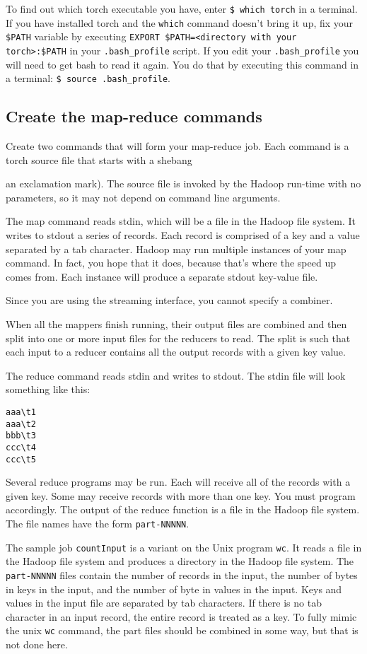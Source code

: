 \documentclass{article}
\let\code\texttt %
\begin{document}
To find out which torch executable you have, enter \code{\$ which torch} in
a terminal. If you have installed torch and the \code{which} command
doesn't bring it up, fix your \code{\$PATH} variable by executing 
\code{EXPORT \$PATH=<directory with your torch>:\$PATH} in your
\code{.bash\_profile} script. If you edit your \code{.bash\_profile} you
will need to get bash to read it again. You do that by executing this
command in a terminal: \code{\$ source .bash\_profile}.

\subsection{Create the map-reduce commands}

Create two commands that will form your map-reduce job. Each command is
a torch source file that starts with a shebang {an exclamation mark).
The source file is invoked by the Hadoop run-time with no parameters,
so it may not depend on command line arguments.

The map command reads stdin, which will be a file in the Hadoop file
system. It writes to stdout a series of records. Each record is
comprised of a key and a value separated by a tab character. Hadoop 
may run multiple instances of your map command. In fact, you hope that
it does, because that's where the speed up comes from. Each instance 
will produce a separate stdout key-value file.

Since you are using the streaming interface, you cannot specify a
combiner. 

When all the mappers finish running, their output files are combined and
then split into one or more input files for the reducers to read. The
split is such that each input to a reducer contains all the output
records with a given key value.

The reduce command reads stdin and writes to stdout. The stdin file
will look something like this:

\begin{verbatim}
aaa\t1
aaa\t2
bbb\t3
ccc\t4
ccc\t5
\end{verbatim}

Several reduce programs may be run. Each will receive all of the records
with a given key. Some may receive records with more than one key. You
must program accordingly. The output of the reduce function is a file in
the Hadoop file system. The file names have the form \code{part-NNNNN}.

The sample job \code{countInput} is a variant on the Unix program
\code{wc}. It reads a file in the Hadoop file system and produces a
directory
in the Hadoop file system. The \code{part-NNNNN} files contain the number of records in the
input, the number of bytes in keys in the input, and the number of byte
in values in the input. Keys and values in the input file are separated
by tab characters. If there is no tab character in an input record, the
entire record is treated as a key. To fully mimic the unix \code{wc}
command, the part files should be combined in some way, but that is not
done here.

}
\end{document}
